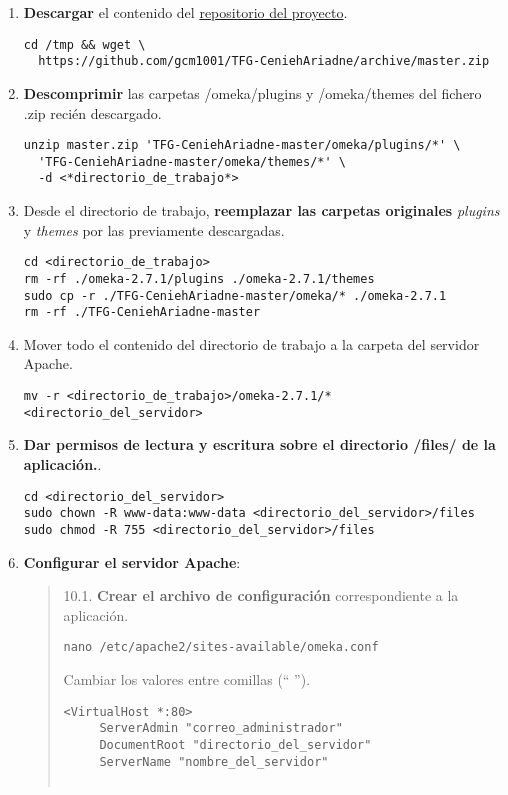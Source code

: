 \begin{enumerate}
\begin{verbatim}
cd <directorio_de_trabajo>/omeka-2.7.1
nano db.ini
\end{verbatim}
  No es necesario modificar los parámetros `prefix` o `port`.
\begin{verbatim}
[database]
host     = "localhost"
username = "usuario"
password = "contraseña"
dbname   = "omekadb"
prefix   = "omeka_"
charset  = "utf8"
;port     = ""
\end{verbatim}
\item
  \textbf{Descargar} el contenido del
  \href{https://github.com/gcm1001/TFG-CeniehAriadne}{repositorio del
  proyecto}.
\begin{verbatim}
cd /tmp && wget \
  https://github.com/gcm1001/TFG-CeniehAriadne/archive/master.zip
\end{verbatim}
\item
  \textbf{Descomprimir} las carpetas {/omeka/plugins} y {/omeka/themes}
  del fichero {.zip} recién descargado.
\begin{verbatim}
unzip master.zip 'TFG-CeniehAriadne-master/omeka/plugins/*' \
  'TFG-CeniehAriadne-master/omeka/themes/*' \
  -d <*directorio_de_trabajo*>
\end{verbatim}
\item
  Desde el directorio de trabajo, \textbf{reemplazar las carpetas
  originales} \emph{plugins} y \emph{themes} por las previamente
  descargadas.
\begin{verbatim}
cd <directorio_de_trabajo>
rm -rf ./omeka-2.7.1/plugins ./omeka-2.7.1/themes
sudo cp -r ./TFG-CeniehAriadne-master/omeka/* ./omeka-2.7.1
rm -rf ./TFG-CeniehAriadne-master
\end{verbatim}
\item
  Mover todo el contenido del directorio de trabajo a la carpeta del
  servidor Apache.
\begin{verbatim}
mv -r <directorio_de_trabajo>/omeka-2.7.1/* <directorio_del_servidor>
\end{verbatim}
\item
  \textbf{Dar permisos de lectura y escritura sobre el directorio /files/ de la aplicación.}.
\begin{verbatim}
cd <directorio_del_servidor>
sudo chown -R www-data:www-data <directorio_del_servidor>/files
sudo chmod -R 755 <directorio_del_servidor>/files
\end{verbatim}
\item
  \textbf{Configurar el servidor Apache}:
\begin{quote}
10.1. \textbf{Crear el archivo de configuración} correspondiente a la
aplicación.
\begin{verbatim}
nano /etc/apache2/sites-available/omeka.conf
\end{verbatim}
Cambiar los valores entre comillas (`` '').
\begin{verbatim}
<VirtualHost *:80>
     ServerAdmin "correo_administrador"
     DocumentRoot "directorio_del_servidor"
     ServerName "nombre_del_servidor"


\end{verbatim}
\end{quote}
\end{enumerate}
